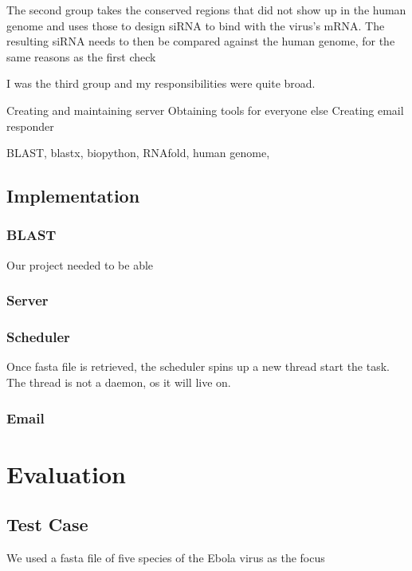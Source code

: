 \documentclass[10pt,letterpaper]{article}
\begin{document}
The second group takes the conserved regions that did not show up in the human genome and uses those to design siRNA to bind with the virus's mRNA.
The resulting siRNA needs to then be compared against the human genome, for the same reasons as the first check

I was the third group and my responsibilities were quite broad.



Creating and maintaining server
Obtaining tools for everyone else
Creating email responder


BLAST, blastx, biopython, RNAfold, human genome,

\subsection{Implementation}




\subsubsection{BLAST}

Our project needed to be able 


\subsubsection{Server}

\subsubsection{Scheduler}


Once fasta file is retrieved, the scheduler spins up a new thread start the task. 
The thread is not a daemon, os it will live on.

\subsubsection{Email}




\section{Evaluation}

\subsection{Test Case}
We used a fasta file of five species of the Ebola virus as the focus



\end{document}

